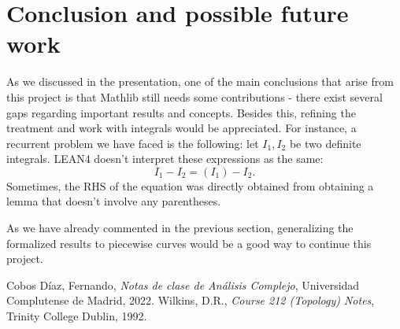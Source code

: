 \documentclass[a4paper,12pt]{article}
\begin{document}
\section{Conclusion and possible future work}
As we discussed in the presentation, one of the main conclusions that arise from this project is that
Mathlib still needs some contributions - there exist several gaps regarding important results and concepts.
Besides this, refining the treatment and work with integrals would be appreciated. For instance, a recurrent problem
we have faced is the following: let $I_1, I_2$ be two definite integrals. LEAN4 doesn't interpret these expressions as the same:
$$I_1 - I_2 = (I_1) - I_2.$$
Sometimes, the RHS of the equation was directly obtained from obtaining a lemma that doesn't involve any parentheses.

As we have already commented in the previous section, generalizing the formalized results to piecewise curves would be a good way to continue this project.

\begin{thebibliography}{9}
 Cobos Díaz, Fernando, \textit{Notas de clase de Análisis Complejo}, Universidad Complutense de Madrid, 2022.
 Wilkins, D.R., \textit{Course 212 (Topology) Notes}, Trinity College Dublin, 1992.
\end{thebibliography}
\end{document}
